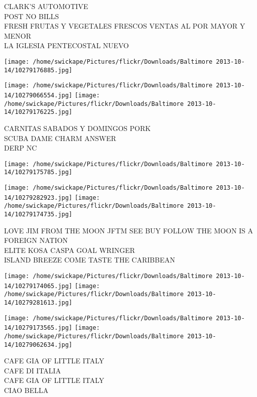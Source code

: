 \documentclass[10pt,letterpaper]{article}
\begin{document}
CLARK'S AUTOMOTIVE\\
POST NO BILLS\\
FRESH FRUTAS Y VEGETALES FRESCOS VENTAS AL POR MAYOR Y MENOR\\
LA IGLESIA PENTECOSTAL NUEVO\\
\pagebreak

\texttt{[image: /home/swickape/Pictures/flickr/Downloads/Baltimore 2013-10-14/10279176885.jpg]}

\vspace{0.25in}
\texttt{[image: /home/swickape/Pictures/flickr/Downloads/Baltimore 2013-10-14/10279066554.jpg]}
\texttt{[image: /home/swickape/Pictures/flickr/Downloads/Baltimore 2013-10-14/10279176225.jpg]}

CARNITAS SABADOS Y DOMINGOS PORK\\
SCUBA DAME CHARM ANSWER\\
DERP NC\\
\pagebreak

\texttt{[image: /home/swickape/Pictures/flickr/Downloads/Baltimore 2013-10-14/10279175785.jpg]}

\vspace{0.25in}
\texttt{[image: /home/swickape/Pictures/flickr/Downloads/Baltimore 2013-10-14/10279282923.jpg]}
\texttt{[image: /home/swickape/Pictures/flickr/Downloads/Baltimore 2013-10-14/10279174735.jpg]}

LOVE JIM FROM THE MOON JFTM SEE BUY FOLLOW THE MOON IS A FOREIGN NATION\\
ELITE KOSA CASPA GOAL WRINGER\\
ISLAND BREEZE COME TASTE THE CARIBBEAN\\
\pagebreak

\texttt{[image: /home/swickape/Pictures/flickr/Downloads/Baltimore 2013-10-14/10279174065.jpg]}
\texttt{[image: /home/swickape/Pictures/flickr/Downloads/Baltimore 2013-10-14/10279281613.jpg]}

\texttt{[image: /home/swickape/Pictures/flickr/Downloads/Baltimore 2013-10-14/10279173565.jpg]}
\texttt{[image: /home/swickape/Pictures/flickr/Downloads/Baltimore 2013-10-14/10279062634.jpg]}

CAFE GIA OF LITTLE ITALY\\
CAFE DI ITALIA\\
CAFE GIA OF LITTLE ITALY\\
CIAO BELLA\\
\pagebreak
\end{document}
